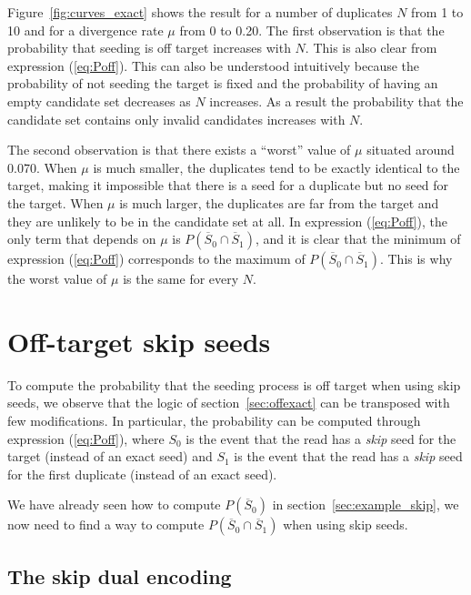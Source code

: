 \documentclass{article}
\begin{document}
Figure~\ref{fig:curves_exact} shows the result for a number of duplicates
$N$ from 1 to 10 and for a divergence rate $\mu$ from 0 to 0.20. The first
observation is that the probability that seeding is off target increases
with $N$. This is also clear from expression (\ref{eq:Poff}). This can
also be understood intuitively because the probability of not seeding the
target is fixed and the probability of having an empty candidate set
decreases as $N$ increases. As a result the probability that the candidate
set contains only invalid candidates increases with $N$.

The second observation is that there exists a ``worst'' value of $\mu$
situated around 0.070. When $\mu$ is much smaller, the duplicates tend to
be exactly identical to the target, making it impossible that there is a
seed for a duplicate but no seed for the target. When $\mu$ is much
larger, the duplicates are far from the target and they are unlikely to be
in the candidate set at all. In expression (\ref{eq:Poff}), the only term
that depends on $\mu$ is $P(\overline{S}_0 \cap \overline{S}_1)$, and it
is clear that the minimum of expression (\ref{eq:Poff}) corresponds to the
maximum of $P(\overline{S}_0 \cap \overline{S}_1)$. This is why the worst
value of $\mu$ is the same for every $N$.


\section{Off-target skip seeds}
\label{sec_offskip}

To compute the probability that the seeding process is off target when
using skip seeds, we observe that the logic of section~\ref{sec:offexact}
can be transposed with few modifications. In particular, the probability
can be computed through expression (\ref{eq:Poff}), where $S_0$ is the
event that the read has a \emph{skip} seed for the target (instead of an
exact seed) and $S_1$ is the event that the read has a \emph{skip} seed
for the first duplicate (instead of an exact seed).

We have already seen how to compute $P(\overline{S}_0)$ in
section~\ref{sec:example_skip}, we now need to find a way to compute
$P(\overline{S}_0 \cap \overline{S}_1)$ when using skip seeds.

\subsection{The skip dual encoding}
\end{document}
